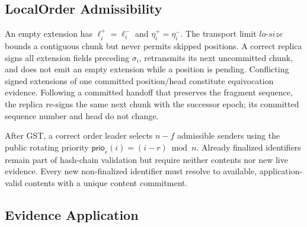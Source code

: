 \subsection{LocalOrder Admissibility}

An empty extension has $\ell_i^+=\ell_i^-$ and
$\eta_i^+=\eta_i^-$.  The transport limit $lo\text{-}size$ bounds a contiguous
chunk but never permits skipped positions.  A correct replica signs all
extension fields preceding $\sigma_i$, retransmits its next uncommitted chunk,
and does not emit an empty extension while a position is pending.  Conflicting
signed extensions of one committed position/head constitute equivocation
evidence.  Following a committed handoff that preserves the fragment sequence,
the replica re-signs the same next chunk with the successor epoch; its committed
sequence number and head do not change.

After GST, a correct order leader selects $n-f$ admissible senders using the
public rotating priority $\mathsf{prio}_r(i)=(i-r)\bmod n$.  Already finalized
identifiers remain part of hash-chain validation but require neither contents
nor new live evidence.  Every new non-finalized identifier must resolve to
available, application-valid contents with a unique content commitment.

\subsection{Evidence Application}

